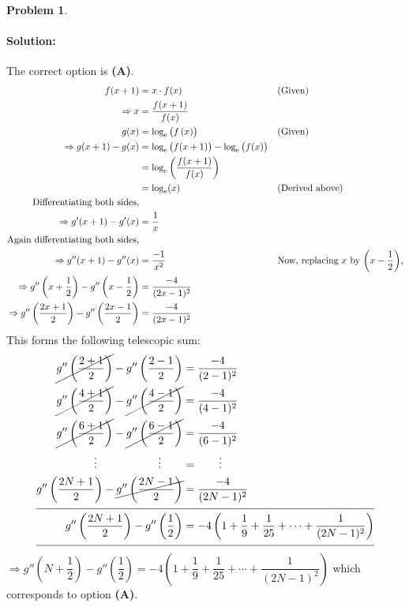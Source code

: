 \documentclass[14]{article}
\theoremstyle{definition}
\newtheorem{prob}{Problem}
\theoremstyle{case}
\begin{document}
\begin{prob}
\paragraph{Solution:} The correct option is \textbf{(A)}.\\
\begin{align*}
f(x + 1) &= x \cdot f(x) && \text{(Given)}\\
\Rightarrow x &= \dfrac{f(x+1)}{f(x)}\\
g(x) &= \log_{\rm e}\left(f\left(x\right)\right) && \text{(Given)}\\
\Rightarrow g(x + 1) - g(x) &= \log_{\rm e}\left(f(x+1)\right) - \log_{\rm e}\left(f(x)\right)\\
&= \log_{\rm e}\left(\dfrac{f(x+1)}{f(x)}\right)\\
&= \log_{\rm e}(x) && \text{(Derived above)}\\
\text{Differentiating both sides,}\\
\Rightarrow g'(x+1) - g'(x) &= \dfrac1x\\
\text{Again differentiating both sides,}\\
\Rightarrow g''(x+1) - g''(x) &= \dfrac{-1}{x^2}&&
\text{Now, replacing $x$ by $\left(x - \dfrac12\right)$,}\\
\Rightarrow g''\left(x+ \dfrac12\right) -g''\left(x- \dfrac12\right) &= \dfrac{-4}{(2x-1)^2}\\
\Rightarrow g''\left(\dfrac{2x + 1}{2}\right) -g''\left(\dfrac{2x-1}{2}\right) &= \dfrac{-4}{(2x-1)^2}
\end{align*}
This forms the following telescopic sum:
\begin{align*}
\cancel{g''\left(\dfrac{2+1}{2}\right)} -
g''\left(\dfrac{2-1}{2}\right) 
&= \dfrac{-4}{(2-1)^2}\\
\cancel{g''\left(\dfrac{4+1}{2}\right)} -
\cancel{g''\left(\dfrac{4-1}{2}\right)}
&= \dfrac{-4}{(4-1)^2}\\
\cancel{g''\left(\dfrac{6+1}{2}\right)} -
\cancel{g''\left(\dfrac{6-1}{2}\right)}
&= \dfrac{-4}{(6-1)^2}\\
\vdots \;\;\;\;\;\;\;\;\;\;\;\;\;\;\;\;\;\;\;\;\vdots\;\;\;\;\;\;\; &= \;\;\;\;\;\;\; \vdots\\
g''\left(\dfrac{2N+1}{2}\right) -
\cancel{g''\left(\dfrac{2N-1}{2}\right)} 
&= \dfrac{-4}{(2N-1)^2}\\
\cline{1-2}
g''\left(\dfrac{2N+1}{2}\right) -
g''\left(\dfrac12\right) &= -4 \left(1 + \dfrac19 + \dfrac{1}{25} + \cdots + \dfrac{1}{(2N-1)^2} \right)\\
\cline{1-2}
\end{align*}
$\Rightarrow g''\left(N + \dfrac{1}{2}\right) - g''\left(\dfrac12\right) = -4 \left(1 + \dfrac19 + \dfrac{1}{25} + \cdots + \dfrac{1}{(2N-1)^2} \right)$ which corresponds to option \textbf{(A)}.
\end{prob}
\end{document}
